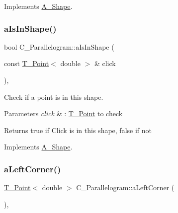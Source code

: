 Implements \hyperlink{classA__Shape_a24991f7667367b646cae75f60df22e28}{A\+\_\+\+Shape}.

\mbox{\label{classC__Parallelogram_a9ccee396c30606bfe64df416c22586d5}} 
\subsubsection{\texorpdfstring{a\+Is\+In\+Shape()}{aIsInShape()}}
{\footnotesize\ttfamily bool C\+\_\+\+Parallelogram\+::a\+Is\+In\+Shape (\begin{DoxyParamCaption}\item[{const \hyperlink{classT__Point}{T\+\_\+\+Point}$<$ double $>$ \&}]{click }\end{DoxyParamCaption})\hspace{0.3cm}{\ttfamily [override]}, {\ttfamily [virtual]}}



Check if a point is in this shape. 


\begin{DoxyParams}{Parameters}
{\em click} & \+: \hyperlink{classT__Point}{T\+\_\+\+Point} to check \\
\hline
\end{DoxyParams}
\begin{DoxyReturn}{Returns}
true if Click is in this shape, false if not 
\end{DoxyReturn}


Implements \hyperlink{classA__Shape_a63f825cbc9780208d9a137f5c14917d0}{A\+\_\+\+Shape}.

\mbox{\label{classC__Parallelogram_a260c557810c63dd97f2dd64bc15b9dc8}} 
\subsubsection{\texorpdfstring{a\+Left\+Corner()}{aLeftCorner()}}
{\footnotesize\ttfamily \hyperlink{classT__Point}{T\+\_\+\+Point}$<$ double $>$ C\+\_\+\+Parallelogram\+::a\+Left\+Corner (\begin{DoxyParamCaption}{ }\end{DoxyParamCaption})\hspace{0.3cm}{\ttfamily [override]}, {\ttfamily [virtual]}}



